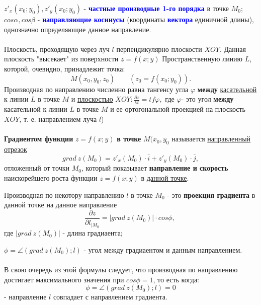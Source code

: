 \documentclass[14pt, letterpaper]{article}
\begin{document}
$z\prime_{x}(x_{0}; y_{0}), z\prime_{y}(x_{0}; y_{0})$  - \textbf{\textcolor{blue}{частные производные 1-го порядка}} в точке $M_{0}$;
$cos\alpha, cos\beta$ - \textbf{\textcolor{blue}{направляющие косинусы}} (координаты  \textbf{\textcolor{blue}{вектора}} единичной длины), однозначно определяющие данное направление.

\paragraph{}

Плоскость, проходящую через луч $l$ перпендикулярно плоскости $XOY$. Данная плоскость "высекает" из поверхности $z = f(x; y)$ Пространственную линию $L$, которой, очевидно, принадлежит точка: $$M(x_{0}, y_{0}, z_{0})\qquad (z_{0} = f(x_{0}; y_{0})).$$ Производная по направлению численно равна тангенсу угла $\varphi$ \textbf{между} \underline{касательной} к линии $L$ в точке $M$ и \underline{плоскостью} $XOY: \frac{\partial z}{\partial l} = tf\varphi, $ где $\varphi$- это угол \textbf{между} касательной к линии $L$ в точке $M$ и ее ортогональной проекцией на плоскость $XOY$, т. е. направлением луча $l$)

\paragraph{}

\textbf{Градиентом функции} $z = f(x; y)$ \textbf{в точке} $M(x_{0}, y_{0}$ называется \underline{направленный отрезок} 
    $$grad \: z(M_{0}) = z\prime_{x}(M_{0}) \cdot \bar i + z\prime_{y}(M_{0}) \cdot \bar j, $$
    отложенный от точки $M_{0}$, который показывает \textbf{направление и скорость} наискорейшего роста функции $z = f(x; y)$ в \underline{данной точке}.

Производная по некотору направлению $l$ в точке $M_{0}$ - это \textbf{проекция градиента} в данной точке на данное направление
$$\frac{\partial z}{\partial l_{|M_{0}}} = |grad \: z(M_{0})| \cdot cos\phi, \: $$
где $|grad \: z(M_{0})|$ - длина градиаента;

$\phi = \angle(grad \:z(M_{0}); l)$ - угол между градиаентом и данным направлением.

\paragraph{}
В свою очередь из этой формулы следует, что производная по направлению достигает максимального значения при $cos\phi = 1$, то есть когда:
    $$\phi = \angle(grad \:z(M_{0}); l) = 0$$- 
    направление $l$ совпадает с направлением градиента.
\end{document}
